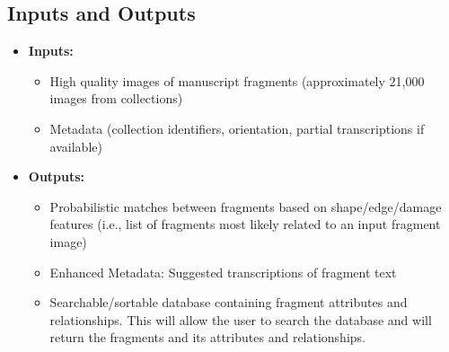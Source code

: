 \documentclass{article}
\begin{document}
\subsection{Inputs and Outputs}


\begin{itemize}
  \item \textbf{Inputs:}
    \begin{itemize}
      \item High quality images of manuscript fragments (approximately 21{,}000 images from collections)
      \item Metadata (collection identifiers, orientation, partial transcriptions if available)
    \end{itemize}

  \item \textbf{Outputs:}
    \begin{itemize}
      \item Probabilistic matches between fragments based on shape/edge/damage features (i.e., list of fragments most likely related to an input fragment image)
      \item Enhanced Metadata: Suggested transcriptions of fragment text
      \item Searchable/sortable database containing fragment attributes and relationships. This will allow the user to search the database and will return the fragments and its attributes and relationships.
    \end{itemize}
\end{itemize}
\end{document}
